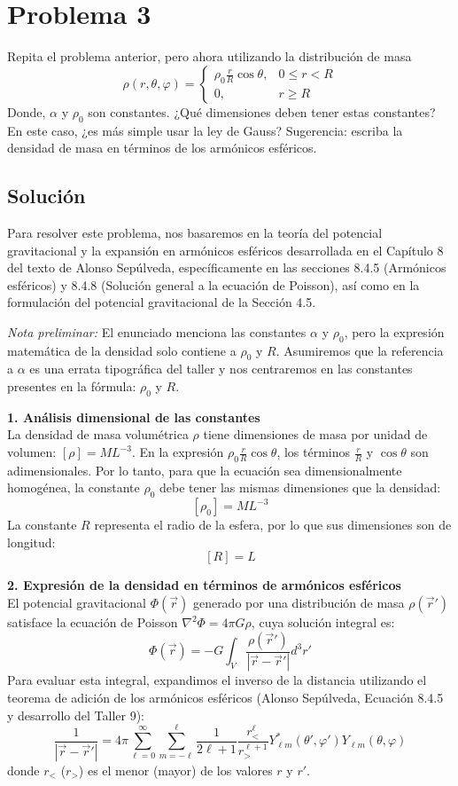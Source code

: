 \documentclass[a4paper]{article}
\begin{document}
\section{Problema 3}
Repita el problema anterior, pero ahora utilizando la distribución de masa
$$
\rho(r, \theta, \varphi) = \begin{cases} 
\rho_0 \frac{r}{R} \cos\theta, & 0 \leq r < R \\ 
0, & r \geq R 
\end{cases}
$$
Donde, $\alpha$ y $\rho_0$ son constantes. ¿Qué dimensiones deben tener estas constantes? En este caso, ¿es más simple usar la ley de Gauss? Sugerencia: escriba la densidad de masa en términos de los armónicos esféricos.

\subsection{Solución}
Para resolver este problema, nos basaremos en la teoría del potencial gravitacional y la expansión en armónicos esféricos desarrollada en el Capítulo 8 del texto de Alonso Sepúlveda, específicamente en las secciones 8.4.5 (Armónicos esféricos) y 8.4.8 (Solución general a la ecuación de Poisson), así como en la formulación del potencial gravitacional de la Sección 4.5. 

\textit{Nota preliminar:} El enunciado menciona las constantes $\alpha$ y $\rho_0$, pero la expresión matemática de la densidad solo contiene a $\rho_0$ y $R$. Asumiremos que la referencia a $\alpha$ es una errata tipográfica del taller y nos centraremos en las constantes presentes en la fórmula: $\rho_0$ y $R$.

\vspace{0.3cm}
\noindent\textbf{1. Análisis dimensional de las constantes} \\
La densidad de masa volumétrica $\rho$ tiene dimensiones de masa por unidad de volumen: $[\rho] = M L^{-3}$. 
En la expresión $\rho_0 \frac{r}{R} \cos\theta$, los términos $\frac{r}{R}$ y $\cos\theta$ son adimensionales. Por lo tanto, para que la ecuación sea dimensionalmente homogénea, la constante $\rho_0$ debe tener las mismas dimensiones que la densidad:
$$
[\rho_0] = M L^{-3}
$$
La constante $R$ representa el radio de la esfera, por lo que sus dimensiones son de longitud:
$$
[R] = L
$$

\vspace{0.3cm}
\noindent\textbf{2. Expresión de la densidad en términos de armónicos esféricos} \\
El potencial gravitacional $\Phi(\vec{r})$ generado por una distribución de masa $\rho(\vec{r}')$ satisface la ecuación de Poisson $\nabla^2 \Phi = 4\pi G \rho$, cuya solución integral es:
$$
\Phi(\vec{r}) = -G \int_V \frac{\rho(\vec{r}')}{|\vec{r} - \vec{r}'|} d^3r'
$$
Para evaluar esta integral, expandimos el inverso de la distancia utilizando el teorema de adición de los armónicos esféricos (Alonso Sepúlveda, Ecuación 8.4.5 y desarrollo del Taller 9):
$$
\frac{1}{|\vec{r} - \vec{r}'|} = 4\pi \sum_{\ell=0}^{\infty} \sum_{m=-\ell}^{\ell} \frac{1}{2\ell+1} \frac{r_{<}^\ell}{r_{>}^{\ell+1}} Y_{\ell m}^*(\theta', \varphi') Y_{\ell m}(\theta, \varphi)
$$
donde $r_{<}$ ($r_{>}$) es el menor (mayor) de los valores $r$ y $r'$. 
\end{document}
